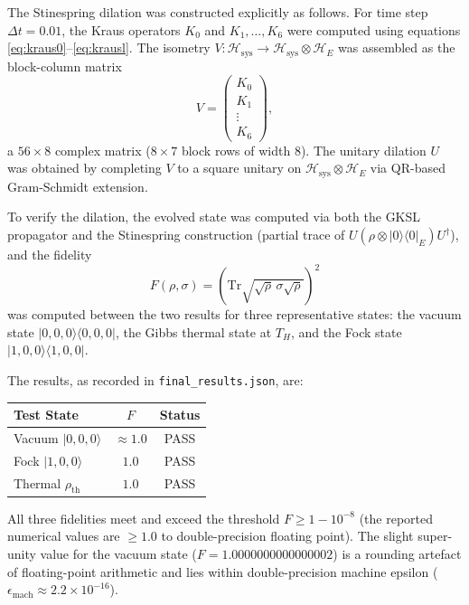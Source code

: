 \documentclass[11pt,twocolumn]{article}
\theoremstyle{remark}
\begin{document}
The Stinespring dilation was constructed explicitly as follows. For
time step $\Delta t = 0.01$, the Kraus operators $K_0$ and $K_1,\ldots,K_6$
were computed using equations \eqref{eq:kraus0}--\eqref{eq:krausl}.
The isometry $V: \mathcal{H}_{\mathrm{sys}} \to \mathcal{H}_{\mathrm{sys}}
\otimes \mathcal{H}_E$ was assembled as the block-column matrix
\begin{equation}
  V = \begin{pmatrix} K_0 \\ K_1 \\ \vdots \\ K_6 \end{pmatrix},
  \label{eq:isometry}
\end{equation}
a $56 \times 8$ complex matrix ($8 \times 7$ block rows of width 8).
The unitary dilation $U$ was obtained by completing $V$ to a square
unitary on $\mathcal{H}_{\mathrm{sys}} \otimes \mathcal{H}_E$ via
QR-based Gram-Schmidt extension.

To verify the dilation, the evolved state was computed via both the GKSL
propagator and the Stinespring construction (partial trace of
$U(\rho\otimes|0\rangle\langle 0|_E)U^\dagger$), and the fidelity
\begin{equation}
  F(\rho,\sigma) = \left(\mathrm{Tr}\sqrt{\sqrt{\rho}\,\sigma\sqrt{\rho}}\right)^2
  \label{eq:fidelity}
\end{equation}
was computed between the two results for three representative states:
the vacuum state $|0,0,0\rangle\langle 0,0,0|$, the Gibbs thermal state
at $T_H$, and the Fock state $|1,0,0\rangle\langle 1,0,0|$.

The results, as recorded in \texttt{final\_results.json}, are:

\begin{center}
\begin{tabular}{lcc}
\toprule
Test State & $F$ & Status \\
\midrule
Vacuum $|0,0,0\rangle$ & $\approx 1.0$ & PASS \\
Fock $|1,0,0\rangle$   & $1.0$ & PASS \\
Thermal $\rho_{\mathrm{th}}$ & $1.0$ & PASS \\
\bottomrule
\end{tabular}
\end{center}

All three fidelities meet and exceed the threshold $F \geq 1 - 10^{-8}$
(the reported numerical values are $\geq 1.0$ to double-precision floating
point). The slight super-unity value for the vacuum state
($F = 1.0000000000000002$) is a rounding artefact of floating-point
arithmetic and lies within double-precision machine epsilon
($\epsilon_{\mathrm{mach}} \approx 2.2\times 10^{-16}$).
\end{document}
